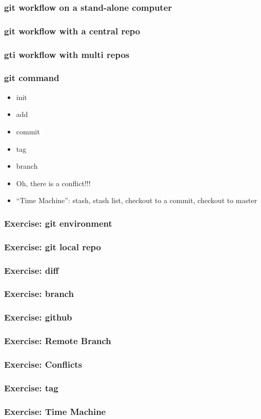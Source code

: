 \begin{frame}\frametitle{git workflow on a stand-alone computer}

\end{frame}

\begin{frame}\frametitle{git workflow with a central repo}

\end{frame}

\begin{frame}\frametitle{gti workflow with multi repos}

\end{frame}

\begin{frame}\frametitle{git command}

\begin{itemize}
\item
  init
\item
  add
\item
  commit
\item
  tag
\item
  branch
\item
  Oh, there is a conflict!!!
\item
  ``Time Machine'': stash, stash list, checkout to a commit, checkout to
  master
\end{itemize}
\end{frame}

\begin{frame}\frametitle{Exercise: git environment}

\end{frame}

\begin{frame}\frametitle{Exercise: git local repo}

\end{frame}

\begin{frame}\frametitle{Exercise: diff}

\end{frame}

\begin{frame}\frametitle{Exercise: branch}

\end{frame}

\begin{frame}\frametitle{Exercise: github}

\end{frame}

\begin{frame}\frametitle{Exercise: Remote Branch}

\end{frame}

\begin{frame}\frametitle{Exercise: Conflicts}

\end{frame}

\begin{frame}\frametitle{Exercise: tag}

\end{frame}

\begin{frame}\frametitle{Exercise: Time Machine}

\end{frame}
